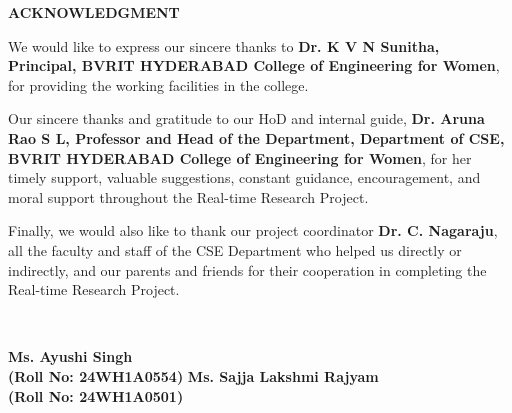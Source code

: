 {\centerline { {\large \textbf{ACKNOWLEDGMENT}}}}
\thispagestyle{empty}
\vspace*{1cm}

We would like to express our sincere thanks to \textbf{Dr. K V N Sunitha, Principal, BVRIT HYDERABAD College of Engineering for Women}, for providing the working facilities in the college.

Our sincere thanks and gratitude to our HoD and internal guide, \textbf{Dr. Aruna Rao S L, Professor and Head of the Department, Department of CSE, BVRIT HYDERABAD College of Engineering for Women}, for her timely support, valuable suggestions, constant guidance, encouragement, and moral support throughout the Real-time Research Project.

Finally, we would also like to thank our project coordinator \textbf{Dr. C. Nagaraju}, all the faculty and staff of the CSE Department who helped us directly or indirectly, and our parents and friends for their cooperation in completing the Real-time Research Project.
\begin{minipage}{10cm}
~\\
\end{minipage}
\begin{minipage}{20cm}
\vskip 1cm
  \textbf{Ms. Ayushi Singh}\\
  \textbf{(Roll No: 24WH1A0554)}
\vskip 2cm
    \textbf{Ms. Sajja Lakshmi Rajyam}\\
  \textbf{(Roll No: 24WH1A0501)}

\end{minipage}